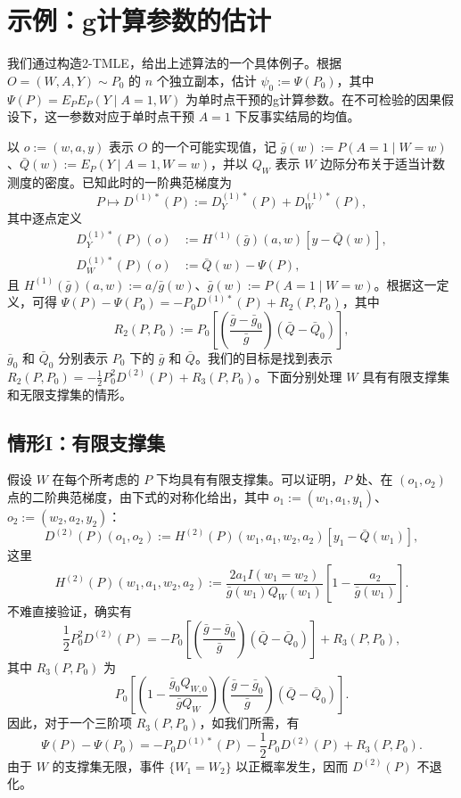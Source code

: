 \section{示例：g计算参数的估计}

我们通过构造2-TMLE，给出上述算法的一个具体例子。根据 $O=(W,A,Y)\sim P_0$ 的 $n$ 个独立副本，估计 $\psi_0:=\Psi(P_0)$，其中 $\Psi(P)=E_PE_P(Y\mid A=1,W)$ 为单时点干预的g计算参数。在不可检验的因果假设下，这一参数对应于单时点干预 $A=1$ 下反事实结局的均值。

以 $o:=(w,a,y)$ 表示 $O$ 的一个可能实现值，记 $\bar g(w):=P(A=1\mid W=w)$、$\bar Q(w):=E_P(Y\mid A=1,W=w)$，并以 $Q_W$ 表示 $W$ 边际分布关于适当计数测度的密度。已知此时的一阶典范梯度为
\[
P\mapsto D^{(1)*}(P):=D_Y^{(1)*}(P)+D_W^{(1)*}(P),
\]
其中逐点定义
\[
\begin{aligned}
D_Y^{(1)*}(P)(o)&:=H^{(1)}(\bar g)(a,w)[y-\bar Q(w)],\\
D_W^{(1)*}(P)(o)&:=\bar Q(w)-\Psi(P),
\end{aligned}
\]
且 $H^{(1)}(\bar g)(a,w):=a/\bar g(w)$、$\bar g(w):=P(A=1\mid W=w)$。根据这一定义，可得 $\Psi(P)-\Psi(P_0)=-P_0D^{(1)*}(P)+R_2(P,P_0)$，其中
\[
R_2(P,P_0):=P_0\left[\left(\frac{\bar g-\bar g_0}{\bar g}\right)(\bar Q-\bar Q_0)\right],
\]
$\bar g_0$ 和 $\bar Q_0$ 分别表示 $P_0$ 下的 $\bar g$ 和 $\bar Q$。我们的目标是找到表示 $R_2(P,P_0)=-\frac12P_0^2D^{(2)}(P)+R_3(P,P_0)$。下面分别处理 $W$ 具有有限支撑集和无限支撑集的情形。

\subsection{情形I：有限支撑集}

假设 $W$ 在每个所考虑的 $P$ 下均具有有限支撑集。可以证明，$P$ 处、在 $(o_1,o_2)$ 点的二阶典范梯度，由下式的对称化给出，其中 $o_1:=(w_1,a_1,y_1)$、$o_2:=(w_2,a_2,y_2)$：
\begin{equation}
D^{(2)}(P)(o_1,o_2):=H^{(2)}(P)(w_1,a_1,w_2,a_2)[y_1-\bar Q(w_1)],
\tag{26.6}
\end{equation}
这里
\[
H^{(2)}(P)(w_1,a_1,w_2,a_2):=
\frac{2a_1I(w_1=w_2)}{\bar g(w_1)Q_W(w_1)}
\left[1-\frac{a_2}{\bar g(w_1)}\right].
\]
不难直接验证，确实有
\begin{equation}
\frac12P_0^2D^{(2)}(P)=
-P_0\left[\left(\frac{\bar g-\bar g_0}{\bar g}\right)(\bar Q-\bar Q_0)\right]+R_3(P,P_0),
\tag{26.7}
\end{equation}
其中 $R_3(P,P_0)$ 为
\[
P_0\left[\left(1-\frac{\bar g_0Q_{W,0}}{\bar gQ_W}\right)
\left(\frac{\bar g-\bar g_0}{\bar g}\right)(\bar Q-\bar Q_0)\right].
\]
因此，对于一个三阶项 $R_3(P,P_0)$，如我们所需，有
\[
\Psi(P)-\Psi(P_0)=-P_0D^{(1)*}(P)-\frac12P_0D^{(2)}(P)+R_3(P,P_0).
\]
由于 $W$ 的支撑集无限，事件 $\{W_1=W_2\}$ 以正概率发生，因而 $D^{(2)}(P)$ 不退化。

